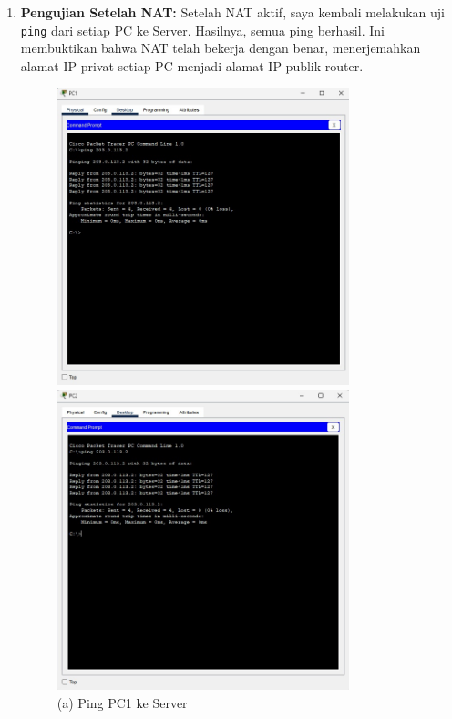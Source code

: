 \begin{enumerate}
    \item \textbf{Pengujian Setelah NAT:} Setelah NAT aktif, saya kembali melakukan uji \texttt{ping} dari setiap PC ke Server. Hasilnya, semua ping berhasil. Ini membuktikan bahwa NAT telah bekerja dengan benar, menerjemahkan alamat IP privat setiap PC menjadi alamat IP publik router.
    \begin{figure}[H]
        \centering
        \begin{minipage}{0.48\textwidth}
            \centering
            \includegraphics[width=0.8\textwidth]{img4/NATpingpc1.jpeg}
            \caption*{(a) Ping PC1 ke Server}
        \end{minipage}\hfill
        \begin{minipage}{0.48\textwidth}
            \centering
            \includegraphics[width=0.8\textwidth]{img4/NATpingpc2.jpeg}

\end{minipage}
\end{figure}
\end{enumerate}
